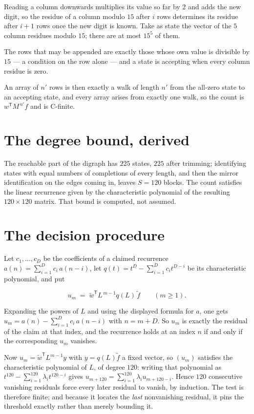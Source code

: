 \documentclass[11pt]{article}
\theoremstyle{definition}
\begin{document}
Reading a column downwards multiplies its value so far by $2$ and adds the new digit, so the residue of a column modulo $15$ after $i$ rows determines its residue after $i+1$ rows once the new digit is known. Take as state the vector of the $5$ column residues modulo $15$; there are at most $15^{5}$ of them.

The rows that may be appended are exactly those whose own value is divisible by $15$ --- a condition on the row alone --- and a state is accepting when every column residue is zero.

An array of $n'$ rows is then exactly a walk of length $n'$ from the all-zero state to an accepting state, and every array arises from exactly one walk, so the count is $w^{\mathsf T}M^{\,n'}f$ and is C-finite.

\section{The degree bound, derived}

The reachable part of the digraph has $225$ states, $225$ after trimming; identifying states with equal numbers of completions of every length, and then the mirror identification on the edges coming in, leaves $S = 120$ blocks. The count satisfies the linear recurrence given by the characteristic polynomial of the resulting $120\times120$ matrix. That bound is computed, not assumed.

\section{The decision procedure}

Let $c_1,\dots,c_D$ be the coefficients of a claimed recurrence $a(n) = \sum_{i=1}^{D} c_i\,a(n-i)$, let $q(t) = t^{D} - \sum_{i=1}^{D} c_i t^{D-i}$ be its characteristic polynomial, and put

\[u_m \;=\; \tilde w^{\mathsf T} L^{\,m-1} q(L)\,\tilde f \qquad (m \ge 1).\]

Expanding the powers of $L$ and using the displayed formula for $a$, one gets $u_m = a(n) - \sum_{i=1}^{D} c_i\,a(n-i)$ with $n = m + D$. So $u_m$ is exactly the residual of the claim at that index, and the recurrence holds at an index $n$ if and only if the corresponding $u_m$ vanishes.

Now $u_m = \tilde w^{\mathsf T} L^{m-1} y$ with $y = q(L)\tilde f$ a fixed vector, so $(u_m)$ satisfies the characteristic polynomial of $L$, of degree $120$: writing that polynomial as $t^{120} - \sum_{i=1}^{120} \lambda_i t^{120-i}$ gives $u_{m+120} = \sum_{i=1}^{120} \lambda_i u_{m+120-i}$. Hence $120$ consecutive vanishing residuals force every later residual to vanish, by induction. The test is therefore finite; and because it locates the {\itshape last} nonvanishing residual, it pins the threshold exactly rather than merely bounding it.
\end{document}
